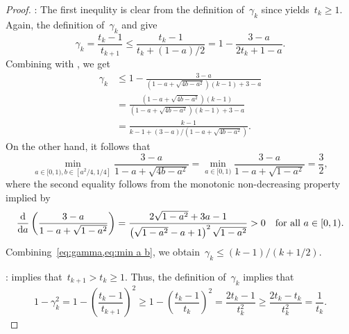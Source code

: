 \documentclass[../main]{subfiles}
\begin{document}
\begin{proof}
    :
    The first inequlity is clear from the definition of~$\gamma_k$ since  yields~$t_k \ge 1$.
    Again, the definition of~$\gamma_k$ and  give
    \[
        \gamma_k = \frac{t_k - 1}{t_{k + 1}} \le \frac{t_k - 1}{t_k + (1 - a) / 2} = 1 - \frac{3 - a}{2 t_k + 1 - a}
    .\] 
    Combining with , we get
    \[ \label{eq:gamma}
        \begin{split}
            \gamma_k &\le 1 - \frac{3 - a}{\left(1 - a + \sqrt{4 b - a^2} \right)(k - 1) + 3 - a} \\
        &= \frac{\left( 1 - a + \sqrt{4 b - a^2} \right) (k - 1)}{\left(1 - a + \sqrt{4 b - a^2} \right)(k - 1) + 3 - a} \\
        &= \frac{k - 1}{k - 1 + (3 - a) / \left( 1 - a + \sqrt{4 b - a^2} \right)}
        .\end{split}
    \] 
    On the other hand, it follows that
    \[ \label{eq:min a b}
        \min_{a \in [0, 1), b \in [a^2 / 4, 1 / 4]} \frac{3 - a}{1 - a + \sqrt{4 b - a^2}} = \min_{a \in [0, 1)} \frac{3 - a}{1 - a + \sqrt{1 - a^2}} = \frac{3}{2}
    ,\]
    where the second equality follows from the monotonic non-decreasing property implied by
    \[
        \odv*{\left(\frac{3 - a}{1 - a + \sqrt{1 - a^2}}\right)}{a} = \frac{2 \sqrt{1 - a^2} + 3a - 1}{\left( \sqrt{1 - a^2} - a + 1 \right)^2 \sqrt{1 - a^2}} > 0 \forallcondition{a \in [0, 1)}
    .\]  
    Combining~\cref{eq:gamma,eq:min a b}, we obtain~$\gamma_k \le (k - 1) / (k + 1 / 2)$.

    :
     implies that~$t_{k + 1} > t_k \ge 1$.
    Thus, the definition of~$\gamma_k$ implies that
    \[
        1 - \gamma_k^2 = 1 - \left( \frac{t_k - 1}{t_{k + 1}} \right)^2 \ge 1 - \left( \frac{t_k - 1}{t_k} \right)^2
        = \frac{2 t_k - 1}{t_k^2} \ge \frac{2 t_k - t_k}{t_k^2} = \frac{1}{t_k}
    .\]
\end{proof}
\end{document}
